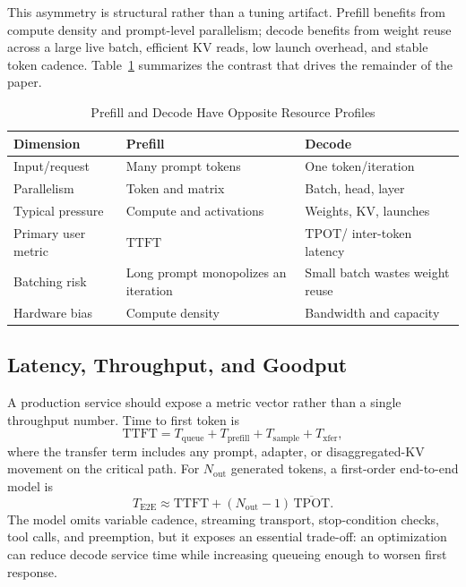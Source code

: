 \documentclass[journal]{IEEEtran}
\newcommand{\TTFT}{\ensuremath{\mathrm{TTFT}}}
\newcommand{\TPOT}{\ensuremath{\mathrm{TPOT}}}
\begin{document}
This asymmetry is structural rather than a tuning artifact. Prefill benefits from compute density and prompt-level parallelism; decode benefits from weight reuse across a large live batch, efficient KV reads, low launch overhead, and stable token cadence. Table~\ref{tab:phases} summarizes the contrast that drives the remainder of the paper.

\begin{table}[t]
\caption{Prefill and Decode Have Opposite Resource Profiles}
\label{tab:phases}
\centering
\footnotesize
\begin{tabularx}{\columnwidth}{@{}p{}XX@{}}
\toprule
Dimension & Prefill & Decode \\
\midrule
Input/request & Many prompt tokens & One token/iteration \\
Parallelism & Token and matrix & Batch, head, layer \\
Typical pressure & Compute and activations & Weights, KV, launches \\
Primary user metric & \TTFT & \TPOT / inter-token latency \\
Batching risk & Long prompt monopolizes an iteration & Small batch wastes weight reuse \\
Hardware bias & Compute density & Bandwidth and capacity \\
\bottomrule
\end{tabularx}
\end{table}

\subsection{Latency, Throughput, and Goodput}
A production service should expose a metric vector rather than a single throughput number. Time to first token is
\begin{equation}
\TTFT = T_{\mathrm{queue}}+T_{\mathrm{prefill}}+T_{\mathrm{sample}}+T_{\mathrm{xfer}},
\label{eq:ttft}
\end{equation}
where the transfer term includes any prompt, adapter, or disaggregated-KV movement on the critical path. For $N_{\mathrm{out}}$ generated tokens, a first-order end-to-end model is
\begin{equation}
T_{\mathrm{E2E}} \approx \TTFT +(N_{\mathrm{out}}-1)\,\overline{\TPOT}.
\label{eq:e2e}
\end{equation}
The model omits variable cadence, streaming transport, stop-condition checks, tool calls, and preemption, but it exposes an essential trade-off: an optimization can reduce decode service time while increasing queueing enough to worsen first response.
\end{document}
